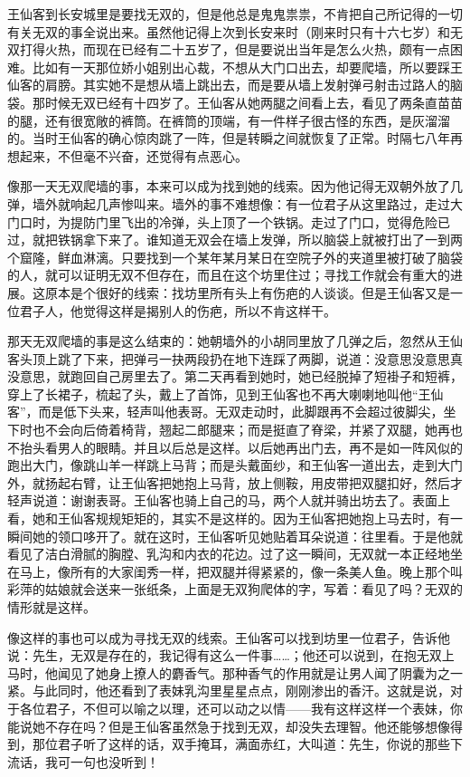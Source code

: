 王仙客到长安城里是要找无双的，但是他总是鬼鬼祟祟，不肯把自己所记得的一切有关无双的事全说出来。虽然他记得上次到长安来时（刚来时只有十六七岁）和无双打得火热，而现在已经有二十五岁了，但是要说出当年是怎么火热，颇有一点困难。比如有一天那位娇小姐别出心裁，不想从大门口出去，却要爬墙，所以要踩王仙客的肩膀。其实她不是想从墙上跳出去，而是要从墙上发射弹弓射击过路人的脑袋。那时候无双已经有十四岁了。王仙客从她两腿之间看上去，看见了两条直苗苗的腿，还有很宽敞的裤筒。在裤筒的顶端，有一件样子很古怪的东西，是灰溜溜的。当时王仙客的确心惊肉跳了一阵，但是转瞬之间就恢复了正常。时隔七八年再想起来，不但毫不兴奋，还觉得有点恶心。 

像那一天无双爬墙的事，本来可以成为找到她的线索。因为他记得无双朝外放了几弹，墙外就响起几声惨叫来。墙外的事不难想像：有一位君子从这里路过，走过大门口时，为提防门里飞出的冷弹，头上顶了一个铁锅。走过了门口，觉得危险已过，就把铁锅拿下来了。谁知道无双会在墙上发弹，所以脑袋上就被打出了一到两个窟隆，鲜血淋漓。只要找到一个某年某月某日在空院子外的夹道里被打破了脑袋的人，就可以证明无双不但存在，而且在这个坊里住过；寻找工作就会有重大的进展。这原本是个很好的线索：找坊里所有头上有伤疤的人谈谈。但是王仙客又是一位君子人，他觉得这样是揭别人的伤疤，所以不肯这样干。 

那天无双爬墙的事是这么结束的：她朝墙外的小胡同里放了几弹之后，忽然从王仙客头顶上跳了下来，把弹弓一抉两段扔在地下连踩了两脚，说道：没意思没意思真没意思，就跑回自己房里去了。第二天再看到她时，她已经脱掉了短褂子和短裤，穿上了长裙子，梳起了头，戴上了首饰，见到王仙客也不再大喇喇地叫他“王仙客”，而是低下头来，轻声叫他表哥。无双走动时，此脚跟再不会超过彼脚尖，坐下时也不会向后倚着椅背，翘起二郎腿来；而是挺直了脊梁，并紧了双腿，她再也不抬头看男人的眼睛。并且以后总是这样。以后她再出门去，再不是如一阵风似的跑出大门，像跳山羊一样跳上马背；而是头戴面纱，和王仙客一道出去，走到大门外，就扬起右臂，让王仙客把她抱上马背，放上侧鞍，用皮带把双腿扣好，然后才轻声说道：谢谢表哥。王仙客也骑上自己的马，两个人就并骑出坊去了。表面上看，她和王仙客规规矩矩的，其实不是这样的。因为王仙客把她抱上马去时，有一瞬间她的领口哆开了。就在这时，王仙客听见她贴着耳朵说道：往里看。于是他就看见了洁白滑腻的胸膛、乳沟和内衣的花边。过了这一瞬间，无双就一本正经地坐在马上，像所有的大家闺秀一样，把双腿并得紧紧的，像一条美人鱼。晚上那个叫彩萍的姑娘就会送来一张纸条，上面是无双狗爬体的字，写着：看见了吗？无双的情形就是这样。 

像这样的事也可以成为寻找无双的线索。王仙客可以找到坊里一位君子，告诉他说：先生，无双是存在的，我记得有这么一件事……；他还可以说到，在抱无双上马时，他闻见了她身上撩人的麝香气。那种香气的作用就是让男人闻了阴囊为之一紧。与此同时，他还看到了表妹乳沟里星星点点，刚刚渗出的香汗。这就是说，对于各位君子，不但可以喻之以理，还可以动之以情——我有这样这样一个表妹，你能说她不存在吗？但是王仙客虽然急于找到无双，却没失去理智。他还能够想像得到，那位君子听了这样的话，双手掩耳，满面赤红，大叫道：先生，你说的那些下流话，我可一句也没听到！ 

